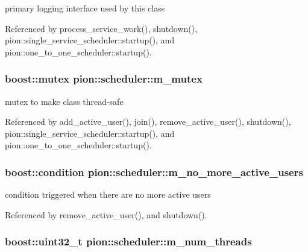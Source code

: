 primary logging interface used by this class 



Referenced by process\-\_\-service\-\_\-work(), shutdown(), pion\-::single\-\_\-service\-\_\-scheduler\-::startup(), and pion\-::one\-\_\-to\-\_\-one\-\_\-scheduler\-::startup().

\hypertarget{classpion_1_1scheduler_a0a1cf13bf9b31229c6d6f030ddbb0d09}{
\subsubsection[{m\-\_\-mutex}]{\setlength{\rightskip}{0pt plus 5cm}boost\-::mutex pion\-::scheduler\-::m\-\_\-mutex\hspace{0.3cm}{\ttfamily [protected]}}}\label{classpion_1_1scheduler_a0a1cf13bf9b31229c6d6f030ddbb0d09}


mutex to make class thread-\/safe 



Referenced by add\-\_\-active\-\_\-user(), join(), remove\-\_\-active\-\_\-user(), shutdown(), pion\-::single\-\_\-service\-\_\-scheduler\-::startup(), and pion\-::one\-\_\-to\-\_\-one\-\_\-scheduler\-::startup().

\hypertarget{classpion_1_1scheduler_a35fe165b525a1babfa8dd2a602d0e598}{
\subsubsection[{m\-\_\-no\-\_\-more\-\_\-active\-\_\-users}]{\setlength{\rightskip}{0pt plus 5cm}boost\-::condition pion\-::scheduler\-::m\-\_\-no\-\_\-more\-\_\-active\-\_\-users\hspace{0.3cm}{\ttfamily [protected]}}}\label{classpion_1_1scheduler_a35fe165b525a1babfa8dd2a602d0e598}


condition triggered when there are no more active users 



Referenced by remove\-\_\-active\-\_\-user(), and shutdown().

\hypertarget{classpion_1_1scheduler_a0ecf6f549714b0e9e33fea80a11a073f}{
\subsubsection[{m\-\_\-num\-\_\-threads}]{\setlength{\rightskip}{0pt plus 5cm}boost\-::uint32\-\_\-t pion\-::scheduler\-::m\-\_\-num\-\_\-threads\hspace{0.3cm}{\ttfamily [protected]}}}\label{classpion_1_1scheduler_a0ecf6f549714b0e9e33fea80a11a073f}


